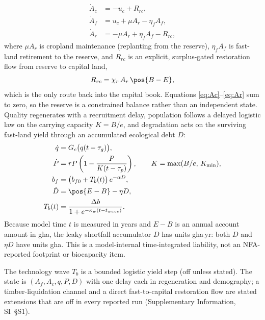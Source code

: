 \begin{align}
\dot A_c&=-u_c+R_{rc},\label{eq:Ac}\\
\dot A_f&=u_c+\mu A_r-\eta_f A_f,\label{eq:Af}\\
\dot A_r&=-\mu A_r+\eta_f A_f-R_{rc},\label{eq:Ar}
\end{align}
where $\mu A_r$ is cropland maintenance (replanting from the reserve), $\eta_f A_f$ is fast-land retirement to the reserve, and $R_{rc}$ is an explicit, surplus-gated restoration flow from reserve to capital land,
\begin{equation}\label{eq:Rrc}
R_{rc}=\chi_r\,A_r\,\pos{B-E},
\end{equation}
which is the only route back into the capital book. Equations \eqref{eq:Ac}--\eqref{eq:Ar} sum to zero, so the reserve is a constrained balance rather than an independent state. Quality regenerates with a recruitment delay, population follows a delayed logistic law \citep{Pearl1925,Hutchinson1948} on the carrying capacity $K=B/e$, and degradation acts on the surviving fast-land yield through an accumulated ecological debt $D$:
\begin{align}
\dot q&=G_c\big(q(t-\tau_g)\big),\label{eq:q}\\
\dot P&=rP\left(1-\frac{P}{K(t-\tau_p)}\right),\qquad K=\max(B/e,\,K_{\min}),\label{eq:P}\\
b_f&=\big(b_{f0}+T_b(t)\big)\,e^{-\alpha D},\label{eq:bf}\\
\dot D&=\pos{E-B}-\eta D,\label{eq:D}\\
T_b(t)&=\frac{\Delta b}{1+e^{-\kappa_w(t-t_{wave})}}.\label{eq:Tb}
\end{align}
Because model time $t$ is measured in years and $E-B$ is an annual account amount in gha, the leaky shortfall accumulator $D$ has units gha\,yr: both $\dot D$ and $\eta D$ have units gha. This is a model-internal time-integrated liability, not an NFA-reported footprint or biocapacity item.

The technology wave $T_b$ is a bounded logistic yield step (off unless stated). The state is $(A_f,A_c,q,P,D)$ with one delay each in regeneration and demography; a timber-liquidation channel and a direct fast-to-capital restoration flow are stated extensions that are off in every reported run (Supplementary Information, SI~\S S1).

